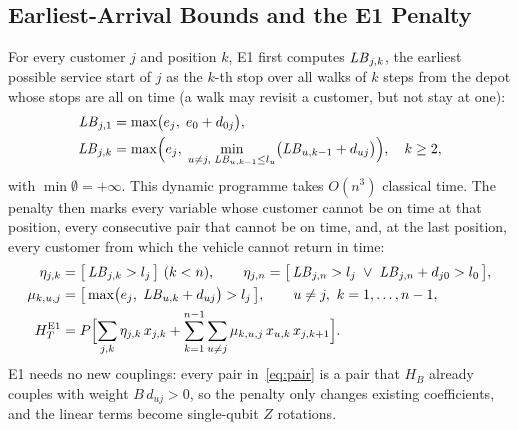 \subsection{Earliest-Arrival Bounds and the E1 Penalty}\label{sec:e1}
For every customer $j$ and position $k$, E1 first computes $\mathit{LB}_{j,k}$, the earliest possible
service start of $j$ as the $k$-th stop over all walks of $k$ steps from the depot whose stops
are all on time (a walk may revisit a customer, but not stay at one):
\begin{align}
  \mathit{LB}_{j,1} &= \max\bigl(e_j,\; e_0 + d_{0j}\bigr), \label{eq:lb1}\\
  \mathit{LB}_{j,k} &= \max\Bigl(e_j,\; \min_{u\neq j,\; \mathit{LB}_{u,k-1}\le l_u} \bigl(\mathit{LB}_{u,k-1} + d_{uj}\bigr)\Bigr),
      \quad k \ge 2, \label{eq:lbk}
\end{align}
with $\min\emptyset=+\infty$. This dynamic programme takes $O(n^3)$ classical time. The penalty then marks every variable whose
customer cannot be on time at that position, every consecutive pair that cannot be on time, and,
at the last position, every customer from which the vehicle cannot return in time:
\begin{align}
  \eta_{j,k} &= \bigl[\,\mathit{LB}_{j,k} > l_j\,\bigr]\ (k<n), \qquad
  \eta_{j,n} = \bigl[\,\mathit{LB}_{j,n} > l_j \;\lor\; \mathit{LB}_{j,n} + d_{j0} > l_0\,\bigr], \label{eq:lin}\\
  \mu_{k,u,j} &= \bigl[\,\max\bigl(e_j,\; \mathit{LB}_{u,k} + d_{uj}\bigr) > l_j\,\bigr], \qquad u \neq j,\ k = 1,\dots,n-1, \label{eq:pair}\\
  H_T^{\mathrm{E1}} &= P\Bigl[\sum_{j,k}\eta_{j,k}\,x_{j,k}
      + \sum_{k=1}^{n-1}\sum_{u\neq j}\mu_{k,u,j}\,x_{u,k}\,x_{j,k+1}\Bigr]. \label{eq:HT1}
\end{align}
E1 needs no new couplings: every pair in~\eqref{eq:pair} is a pair that $H_B$ already
couples with weight $B\,d_{uj}>0$, so the penalty only changes existing coefficients, and the
linear terms become single-qubit $Z$ rotations.

